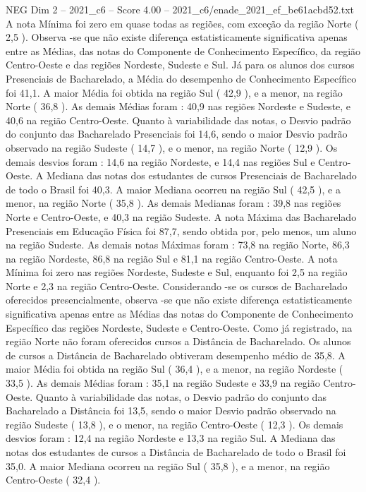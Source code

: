 \begin{textsample}{NEG Dim 2 – 2021\_c6 – Score 4.00 – 2021\_c6/enade\_2021\_ef\_be61acbd52.txt}
A nota Mínima foi zero em quase todas as regiões, com exceção da região Norte ( 2,5 ).
Observa -se que não existe diferença estatisticamente significativa apenas entre as Médias, das notas do Componente de Conhecimento Específico, da região Centro-Oeste e das regiões Nordeste, Sudeste e Sul.
Já para os alunos dos cursos Presenciais de Bacharelado, a Média do desempenho de Conhecimento Específico foi 41,1.
A maior Média foi obtida na região Sul ( 42,9 ), e a menor, na região Norte ( 36,8 ).
As demais Médias foram : 40,9 nas regiões Nordeste e Sudeste, e 40,6 na região Centro-Oeste.
Quanto à variabilidade das notas, o Desvio padrão do conjunto das Bacharelado Presenciais foi 14,6, sendo o maior Desvio padrão observado na região Sudeste ( 14,7 ), e o menor, na região Norte ( 12,9 ).
Os demais desvios foram : 14,6 na região Nordeste, e 14,4 nas regiões Sul e Centro-Oeste.
A Mediana das notas dos estudantes de cursos Presenciais de Bacharelado de todo o Brasil foi 40,3.
A maior Mediana ocorreu na região Sul ( 42,5 ), e a menor, na região Norte ( 35,8 ).
As demais Medianas foram : 39,8 nas regiões Norte e Centro-Oeste, e 40,3 na região Sudeste.
A nota Máxima das Bacharelado Presenciais em Educação Física foi 87,7, sendo obtida por, pelo menos, um aluno na região Sudeste.
As demais notas Máximas foram : 73,8 na região Norte, 86,3 na região Nordeste, 86,8 na região Sul e 81,1 na região Centro-Oeste.
A nota Mínima foi zero nas regiões Nordeste, Sudeste e Sul, enquanto foi 2,5 na região Norte e 2,3 na região Centro-Oeste.
Considerando -se os cursos de Bacharelado oferecidos presencialmente, observa -se que não existe diferença estatisticamente significativa apenas entre as Médias das notas do Componente de Conhecimento Específico das regiões Nordeste, Sudeste e Centro-Oeste.
Como já registrado, na região Norte não foram oferecidos cursos a Distância de Bacharelado.
Os alunos de cursos a Distância de Bacharelado obtiveram desempenho médio de 35,8.
A maior Média foi obtida na região Sul ( 36,4 ), e a menor, na região Nordeste ( 33,5 ).
As demais Médias foram : 35,1 na região Sudeste e 33,9 na região Centro-Oeste.
Quanto à variabilidade das notas, o Desvio padrão do conjunto das Bacharelado a Distância foi 13,5, sendo o maior Desvio padrão observado na região Sudeste ( 13,8 ), e o menor, na região Centro-Oeste ( 12,3 ).
Os demais desvios foram : 12,4 na região Nordeste e 13,3 na região Sul.
A Mediana das notas dos estudantes de cursos a Distância de Bacharelado de todo o Brasil foi 35,0.
A maior Mediana ocorreu na região Sul ( 35,8 ), e a menor, na região Centro-Oeste ( 32,4 ).

\end{textsample}
